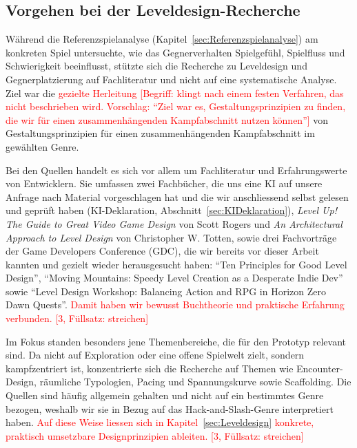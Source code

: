 \documentclass[../Main.tex]{subfiles}
\begin{document}
\subsection{Vorgehen bei der Leveldesign-Recherche} \label{sec:VorgehenLeveldesign}
Während die Referenzspielanalyse (Kapitel~\ref{sec:Referenzspielanalyse}) am konkreten Spiel untersuchte, wie das Gegnerverhalten Spielgefühl, Spielfluss und Schwierigkeit beeinflusst, stützte sich die Recherche zu Leveldesign und Gegnerplatzierung auf Fachliteratur und nicht auf eine systematische Analyse. Ziel war die \textcolor{red}{gezielte Herleitung [Begriff: klingt nach einem festen Verfahren, das nicht beschrieben wird. Vorschlag: \enquote{Ziel war es, Gestaltungsprinzipien zu finden, die wir für einen zusammenhängenden Kampfabschnitt nutzen können}]} von Gestaltungsprinzipien für einen zusammenhängenden Kampfabschnitt im gewählten Genre.

Bei den Quellen handelt es sich vor allem um Fachliteratur und Erfahrungswerte von Entwicklern. Sie umfassen zwei Fachbücher, die uns eine KI auf unsere Anfrage nach Material vorgeschlagen hat und die wir anschliessend selbst gelesen und geprüft haben (KI-Deklaration, Abschnitt~\ref{sec:KIDeklaration}), \textit{Level Up! The Guide to Great Video Game Design} von Scott Rogers\autocite{rogers2014levelup} und \textit{An Architectural Approach to Level Design} von Christopher W. Totten\autocite{totten2014architectural}, sowie drei Fachvorträge der Game Developers Conference (GDC), die wir bereits vor dieser Arbeit kannten und gezielt wieder herausgesucht haben: \enquote{Ten Principles for Good Level Design}\autocite{gdc_tenprinciples2010}, \enquote{Moving Mountains: Speedy Level Creation as a Desperate Indie Dev}\autocite{gdc_movingmountains2020} sowie \enquote{Level Design Workshop: Balancing Action and RPG in Horizon Zero Dawn Quests}\autocite{gdc_horizonquests2018}. \textcolor{red}{Damit haben wir bewusst Buchtheorie und praktische Erfahrung verbunden. [3, Füllsatz: streichen]}

Im Fokus standen besonders jene Themenbereiche, die für den Prototyp relevant sind. Da  nicht auf Exploration oder eine offene Spielwelt zielt, sondern kampfzentriert ist, konzentrierte sich die Recherche auf Themen wie Encounter-Design, räumliche Typologien, Pacing und Spannungskurve sowie Scaffolding. Die Quellen sind häufig allgemein gehalten und nicht auf ein bestimmtes Genre bezogen, weshalb wir sie in Bezug auf das Hack-and-Slash-Genre interpretiert haben. \textcolor{red}{Auf diese Weise liessen sich in Kapitel~\ref{sec:Leveldesign} konkrete, praktisch umsetzbare Designprinzipien ableiten. [3, Füllsatz: streichen]}
\end{document}
